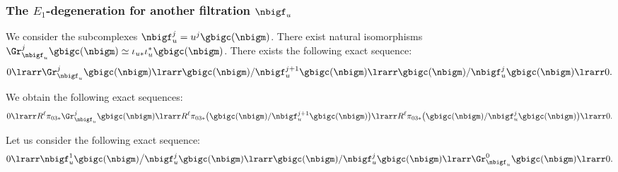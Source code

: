 \documentclass[a4,10pt]{article}
\begin{document}
\subsubsection{The $E_1$-degeneration for another filtration
$\nbigf_u$}

We consider the subcomplexes
$\nbigf_u^j=u^j\gbigc(\nbigm)$.
There exist natural isomorphisms
$\Gr_{\nbigf_u}^j\gbigc(\nbigm)
\simeq
\iota_{u\ast}\iota_{u}^{\ast}\gbigc(\nbigm)$.
There exists the following exact sequence:
\begin{equation}
0\lrarr
      \Gr_{\nbigf_u}^j\gbigc(\nbigm)
      \lrarr
      \gbigc(\nbigm)/\nbigf_u^{j+1}\gbigc(\nbigm)
 \lrarr
      \gbigc(\nbigm)/\nbigf_u^{j}\gbigc(\nbigm)
\lrarr 0.
\end{equation}
\begin{prop}
\label{prop;23.3.29.30}
We obtain the following exact sequences:
\begin{equation}
 \label{eq;23.3.29.13}
0\lrarr
      R^{\ell}\pi_{03\ast}
      \Gr_{\nbigf_u}^j\gbigc(\nbigm)
 \lrarr
            R^{\ell}\pi_{03\ast}\bigl(
      \gbigc(\nbigm)/\nbigf_u^{j+1}\gbigc(\nbigm)
 \bigr)
 \\
      \lrarr
            R^{\ell}\pi_{03\ast}\bigl(
      \gbigc(\nbigm)/\nbigf_u^{j}\gbigc(\nbigm)
      \bigr)
\lrarr0.
 \end{equation}
\end{prop}
\pf
Let us consider the following exact sequence:
\[
      0\lrarr
 \nbigf_u^1\gbigc(\nbigm)\big/
 \nbigf_u^j\gbigc(\nbigm)
 \lrarr
 \gbigc(\nbigm)/\nbigf_u^{j}\gbigc(\nbigm)
 \\
      \lrarr
      \Gr_{\nbigf_u}^0\gbigc(\nbigm)
\lrarr0.
\]
\end{document}
